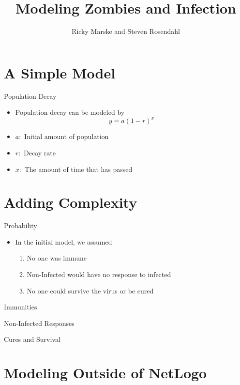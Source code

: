 \documentclass{beamer}
\title{Modeling Zombies and Infection}
\author{Ricky Marske and Steven Rosendahl}
\date{}
\begin{document}
\frame{\titlepage}

\section{A Simple Model}

\begin{frame}{Population Decay}
\begin{itemize}
\item Population decay can be modeled by
\[y=a(1-r)^{x}\]
\pause
\item $a:$ Initial amount of population
\pause
\item $r:$ Decay rate
\pause
\item $x:$ The amount of time that has passed
\end{itemize}
\end{frame}

\section{Adding Complexity}

\begin{frame}{Probability}
\begin{itemize}
\item In the initial model, we assumed
\pause
\begin{enumerate}
\item No one was immune
\pause
\item Non-Infected would have no response to infected
\pause
\item No one could survive the virus or be cured
\end{enumerate}
\end{itemize}
\end{frame}

\begin{frame}{Immunities}

\end{frame}

\begin{frame}{Non-Infected Responses}

\end{frame}

\begin{frame}{Cures and Survival}

\end{frame}

\section{Modeling Outside of NetLogo}
\end{document}
